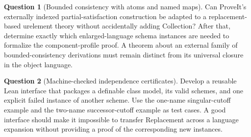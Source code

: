 \documentclass[11pt,letterpaper]{article}
\numberwithin{equation}{section}
\theoremstyle{plain}
\theoremstyle{definition}
\newtheorem{question}[question]{Question}
\theoremstyle{remark}
\begin{document}
\begin{question}[Bounded consistency with atoms and named maps]
Can ProveIt's externally indexed partial-satisfaction construction be adapted to a replacement-based urelement theory without accidentally adding Collection? After that, determine exactly which enlarged-language schema instances are needed to formalize the component-profile proof. A theorem about an external family of bounded-consistency derivations must remain distinct from its universal closure in the object language.
\end{question}

\begin{question}[Machine-checked independence certificates]
Develop a reusable Lean interface that packages a definable class model, its valid schemes, and one explicit failed instance of another scheme. Use the one-name singular-cutoff example and the two-name successor-cutoff example as test cases. A good interface should make it impossible to transfer Replacement across a language expansion without providing a proof of the corresponding new instances.
\end{question}
\end{document}
